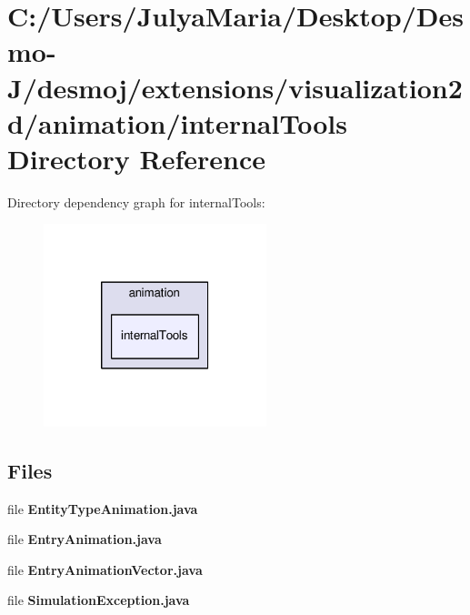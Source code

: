 \section{C\-:/\-Users/\-Julya\-Maria/\-Desktop/\-Desmo-\/\-J/desmoj/extensions/visualization2d/animation/internal\-Tools Directory Reference}
\label{dir_6375bf190352bdbe2c4ce8db100281d3}
Directory dependency graph for internal\-Tools\-:
\nopagebreak
\begin{figure}[H]
\begin{center}
\leavevmode
\includegraphics[width=184pt]{dir_6375bf190352bdbe2c4ce8db100281d3_dep}
\end{center}
\end{figure}
\subsection*{Files}
\begin{DoxyCompactItemize}
\item 
file {\bfseries Entity\-Type\-Animation.\-java}
\item 
file {\bfseries Entry\-Animation.\-java}
\item 
file {\bfseries Entry\-Animation\-Vector.\-java}
\item 
file {\bfseries Simulation\-Exception.\-java}
\end{DoxyCompactItemize}
